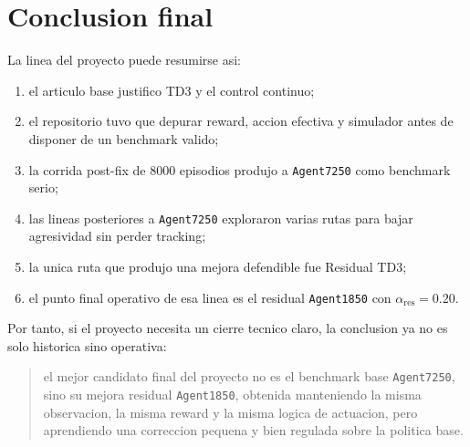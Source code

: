 \documentclass[11pt,a4paper]{article}
\begin{document}
\section{Conclusion final}

La linea del proyecto puede resumirse asi:
\begin{enumerate}[leftmargin=1.5em]
\item el articulo base justifico TD3 y el control continuo;
\item el repositorio tuvo que depurar reward, accion efectiva y simulador antes de disponer de un benchmark valido;
\item la corrida post-fix de 8000 episodios produjo a \texttt{Agent7250} como benchmark serio;
\item las lineas posteriores a \texttt{Agent7250} exploraron varias rutas para bajar agresividad sin perder tracking;
\item la unica ruta que produjo una mejora defendible fue Residual TD3;
\item el punto final operativo de esa linea es el residual \texttt{Agent1850} con \(\alpha_{\mathrm{res}}=0.20\).
\end{enumerate}

Por tanto, si el proyecto necesita un cierre tecnico claro, la conclusion ya no es solo historica sino operativa:

\begin{quote}
el mejor candidato final del proyecto no es el benchmark base \texttt{Agent7250}, sino su mejora residual \texttt{Agent1850}, obtenida manteniendo la misma observacion, la misma reward y la misma logica de actuacion, pero aprendiendo una correccion pequena y bien regulada sobre la politica base.
\end{quote}



\end{document}
